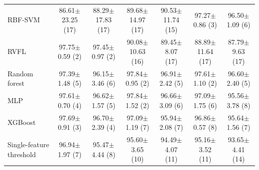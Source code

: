 \begin{tabular}{l*{6}{c}}
RBF-SVM & 86.61$\pm$23.25 (17) & 88.29$\pm$17.83 (17) & 89.68$\pm$14.97 (17) & 90.53$\pm$11.74 (15) & 97.27$\pm$0.86 (3) & 96.50$\pm$1.09 (6) \\
RVFL & 97.75$\pm$0.59 (2) & 97.45$\pm$0.97 (2) & 90.08$\pm$10.63 (16) & 89.45$\pm$8.07 (17) & 88.89$\pm$11.64 (17) & 87.79$\pm$9.63 (17) \\
Random forest & 97.39$\pm$1.48 (5) & 96.15$\pm$3.46 (6) & 97.84$\pm$0.95 (2) & 96.91$\pm$2.42 (5) & 97.61$\pm$1.10 (2) & 96.60$\pm$2.40 (5) \\
MLP & 97.61$\pm$0.70 (4) & 96.62$\pm$1.57 (5) & 97.84$\pm$1.52 (2) & 96.66$\pm$3.09 (6) & 97.09$\pm$1.75 (6) & 95.56$\pm$3.78 (8) \\
XGBoost & 97.69$\pm$0.91 (3) & 96.70$\pm$2.39 (4) & 97.09$\pm$1.19 (7) & 95.94$\pm$2.08 (7) & 96.86$\pm$0.57 (8) & 95.64$\pm$1.56 (7) \\
Single-feature threshold & 96.94$\pm$1.97 (7) & 95.47$\pm$4.44 (8) & 95.60$\pm$3.65 (10) & 94.49$\pm$4.07 (11) & 95.16$\pm$3.52 (11) & 93.65$\pm$4.41 (14) \\
\bottomrule
\end{tabular}

